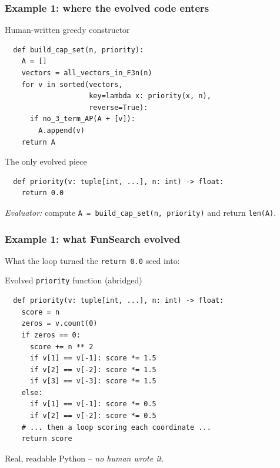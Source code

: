 \documentclass{beamer}
\theoremstyle{definition}
\newcommand\remph[1]{\emph{\textcolor{red}{#1}}}
\begin{document}


\begin{frame}[fragile]
  \frametitle{Example 1: where the evolved code enters}
  \begin{block}{Human-written greedy constructor}
  \scriptsize
  \begin{verbatim}
  def build_cap_set(n, priority):
    A = []
    vectors = all_vectors_in_F3n(n)
    for v in sorted(vectors,
                    key=lambda x: priority(x, n),
                    reverse=True):
      if no_3_term_AP(A + [v]):
        A.append(v)
    return A
  \end{verbatim}
  \normalsize
  \end{block}
  \pause

  \begin{block}{The only evolved piece}
  \scriptsize
  \begin{verbatim}
  def priority(v: tuple[int, ...], n: int) -> float:
    return 0.0
  \end{verbatim}
  \normalsize
  \end{block}
  \pause
  \vspace{.05cm}

  \emph{Evaluator:} compute \texttt{A = build\_cap\_set(n, priority)}
  and return \texttt{len(A)}.
\end{frame}


\begin{frame}[fragile]
  \frametitle{Example 1: what FunSearch evolved}
  What the loop turned the \texttt{return 0.0} seed into:
  \vspace{.15cm}

  \begin{block}{Evolved \texttt{priority} function (abridged)}
  \scriptsize
  \begin{verbatim}
  def priority(v: tuple[int, ...], n: int) -> float:
    score = n
    zeros = v.count(0)
    if zeros == 0:
      score += n ** 2
      if v[1] == v[-1]: score *= 1.5
      if v[2] == v[-2]: score *= 1.5
      if v[3] == v[-3]: score *= 1.5
    else:
      if v[1] == v[-1]: score *= 0.5
      if v[2] == v[-2]: score *= 0.5
    # ... then a loop scoring each coordinate ...
    return score
  \end{verbatim}
  \normalsize
  \end{block}
  \pause
  \vspace{.1cm}

  Real, readable Python -- \emph{no human wrote it}.
\end{frame}
\end{document}
